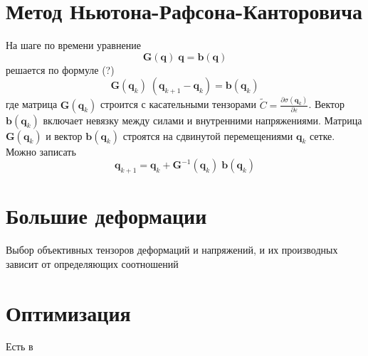 \section{Метод Ньютона-Рафсона-Канторовича}
На шаге по времени уравнение
\begin{equation}
\mathbf{G}\left(\mathbf{q}\right)\;\mathbf{q}=\mathbf{b}\left(\mathbf{q}\right)
\end{equation}
решается по формуле (?)
\begin{equation}
\mathbf{G}\left(\mathbf{q}_k\right)\;\left(\mathbf{q}_{k+1}-\mathbf{q}_{k}\right)=
\mathbf{b}\left(\mathbf{q}_k\right)%
\end{equation}
где матрица $\mathbf{G}\left(\mathbf{q}_k\right)$ строится с касательными тензорами $\tilde{C}=\frac{\partial\sigma\left(\mathbf{q}_k\right) }{\partial\varepsilon}$. Вектор $\mathbf{b}\left(\mathbf{q}_k\right)$ включает невязку между силами и внутренними напряжениями. Матрица $\mathbf{G}\left(\mathbf{q}_k\right)$ и вектор $\mathbf{b}\left(\mathbf{q}_k\right)$ строятся на сдвинутой перемещениями $\mathbf{q}_k$ сетке. Можно записать
\begin{equation}
\mathbf{q}_{k+1}=\mathbf{q}_{k}+\mathbf{G}^{-1}\left(\mathbf{q}_k\right)\;\mathbf{b}\left(\mathbf{q}_k\right)
\end{equation}
\section{Большие деформации}
Выбор объективных тензоров деформаций и напряжений, и их производных зависит от определяющих соотношений \cite{Korobeynikov2000}
\section{Оптимизация}
Есть в \cite{Smetannikov2009,Bormotin2019}
